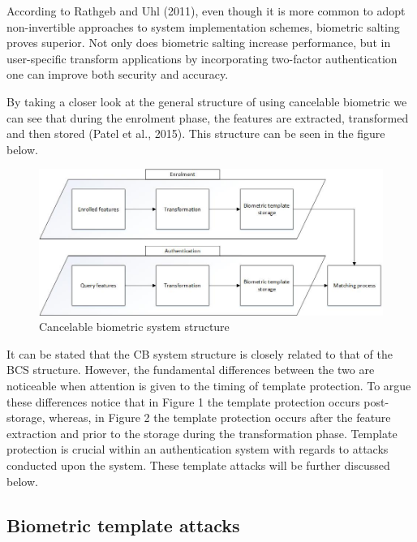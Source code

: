 According to Rathgeb and Uhl (2011), even though it is more common to adopt non-invertible approaches to system implementation schemes, biometric salting proves superior. Not only does biometric salting increase performance, but in user-specific transform applications by incorporating two-factor authentication one can improve both security and accuracy.

By taking a closer look at the general structure of using cancelable biometric we can see that during the enrolment phase, the features are extracted, transformed and then stored (Patel et al., 2015). This structure can be seen in the figure below.


\begin{figure}[htbp!] 
\centering    
\includegraphics[width=1.0\textwidth]{Chapter2/Figs/Cancelable_biometric_system_structure.jpg}
\caption[Cancelable biometric system structure]{Cancelable biometric system structure}
\label{fig:Cancelable biometric system structure}
\end{figure}

It can be stated that the CB system structure is closely related to that of the BCS structure. However, the fundamental differences between the two are noticeable when attention is given to the timing of template protection. To argue these differences notice that in Figure 1 the template protection occurs post-storage, whereas, in Figure 2 the template protection occurs after the feature extraction and prior to the storage during the transformation phase. Template protection is crucial within an authentication system with regards to attacks conducted upon the system. These template attacks will be further discussed below.

    \subsection{ Biometric template attacks}
    
